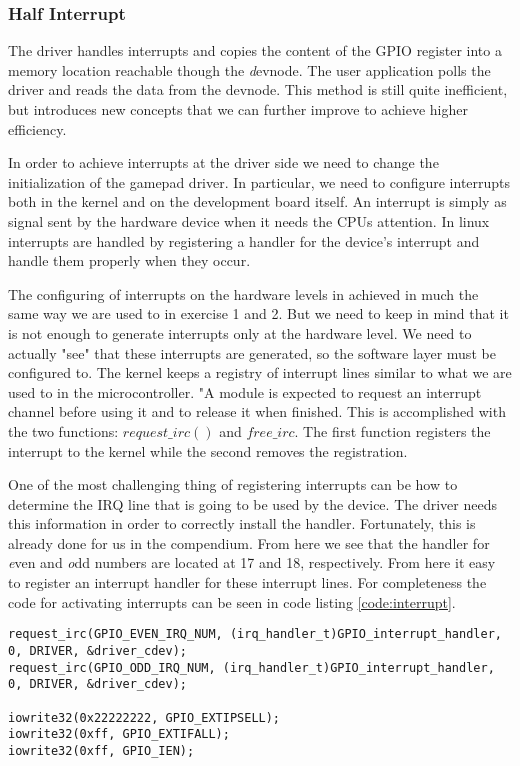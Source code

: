 \subsubsection{Half Interrupt}
The driver handles interrupts and copies the content of the GPIO register into a memory location reachable though the {\emph devnode}. The user application polls the driver and reads the data from the devnode. This method is still quite inefficient, but introduces new concepts that we can further improve to achieve higher efficiency. 

In order to achieve interrupts at the driver side we need to change the initialization of the gamepad driver. In particular, we need to configure interrupts both in the kernel and on the development board itself. An interrupt is simply as signal sent by the hardware device when it needs the CPUs attention. In linux interrupts are handled by registering a handler for the device's interrupt and handle them properly when they occur. 

The configuring of interrupts on the hardware levels in achieved in much the same way we are used to 
in exercise 1 and 2. But we need to keep in mind that it is not enough to generate interrupts only at the hardware level. We need to actually "see" that these interrupts are generated, so the software layer must be configured to. The kernel keeps a registry of interrupt lines similar to what we are used to in the microcontroller. "A module is expected to request an interrupt channel before using it and to release it when finished. This is accomplished with the two functions: $request\_irc()$ and $free\_irc$. The first function registers the interrupt to the kernel while the second removes the registration. 

One of the most challenging thing of registering interrupts can be how to determine the IRQ line that is going to be used by the device. The driver needs this information in order to correctly install the handler. Fortunately, this is already done for us in the compendium. From here we see that the handler for {\emph even} and {\emph odd} numbers are located at 17 and 18, respectively. From here it easy to register an interrupt handler for these interrupt lines. For completeness the code for activating interrupts can be seen in code listing \ref{code:interrupt}.

\begin{lstlisting}[caption=Activate interupts, label=code:interrupt]
request_irc(GPIO_EVEN_IRQ_NUM, (irq_handler_t)GPIO_interrupt_handler, 0, DRIVER, &driver_cdev);
request_irc(GPIO_ODD_IRQ_NUM, (irq_handler_t)GPIO_interrupt_handler, 0, DRIVER, &driver_cdev);

iowrite32(0x22222222, GPIO_EXTIPSELL);
iowrite32(0xff, GPIO_EXTIFALL);
iowrite32(0xff, GPIO_IEN);
\end{lstlisting}






